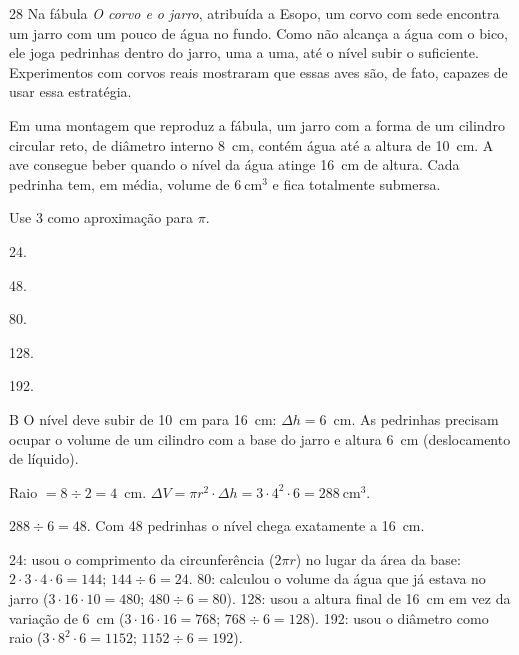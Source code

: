 \begin{questaoinedita}{2}{8}
Na fábula \emph{O corvo e o jarro}, atribuída a Esopo, um corvo com sede encontra
um jarro com um pouco de água no fundo. Como não alcança a água com o bico, ele
joga pedrinhas dentro do jarro, uma a uma, até o nível subir o suficiente.
Experimentos com corvos reais mostraram que essas aves são, de fato, capazes de
usar essa estratégia.

Em uma montagem que reproduz a fábula, um jarro com a forma de um cilindro
circular reto, de diâmetro interno 8~cm, contém água até a altura de 10~cm. A
ave consegue beber quando o nível da água atinge 16~cm de altura. Cada pedrinha
tem, em média, volume de $6\ \text{cm}^3$ e fica totalmente submersa.

Use 3 como aproximação para $\pi$.

\begin{alternativas*}[5]
  \item 24.
  \item 48.
  \item 80.
  \item 128.
  \item 192.
\end{alternativas*}
\end{questaoinedita}
\begin{resolucao}{B}
 O nível deve subir de 10~cm para 16~cm:
$\Delta h = 6$~cm. As pedrinhas precisam ocupar o volume de um cilindro com a
base do jarro e altura 6~cm (deslocamento de líquido).

 Raio $= 8\div 2 = 4$~cm.
$\Delta V = \pi r^2\cdot\Delta h = 3\cdot 4^2\cdot 6 = 288\ \text{cm}^3$.

 $288\div 6 = 48$. Com 48 pedrinhas o nível chega
exatamente a 16~cm.

\begin{distratores}
 24: usou o comprimento da circunferência ($2\pi r$) no lugar da área da
base: $2\cdot 3\cdot 4\cdot 6 = 144$; $144\div 6 = 24$.
 80: calculou o volume da água que já estava no jarro
($3\cdot 16\cdot 10 = 480$; $480\div 6 = 80$).
 128: usou a altura final de 16~cm em vez da variação de 6~cm
($3\cdot 16\cdot 16 = 768$; $768\div 6 = 128$).
 192: usou o diâmetro como raio ($3\cdot 8^2\cdot 6 = 1152$;
$1152\div 6 = 192$).
\end{distratores}
\end{resolucao}

